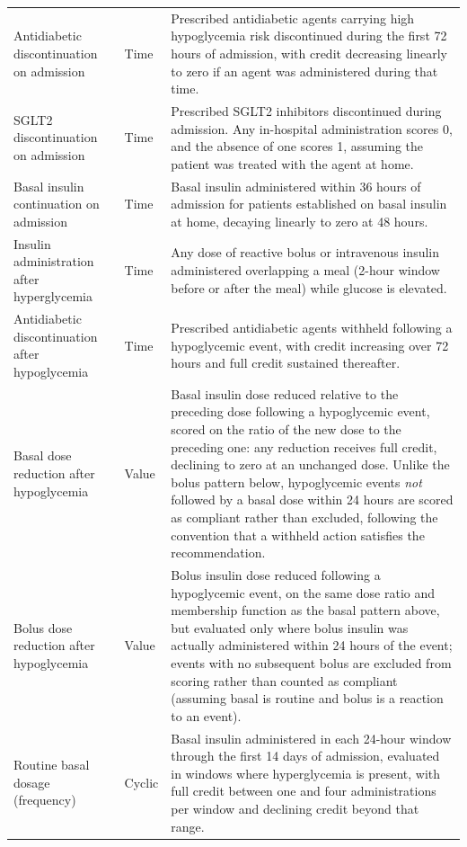 \begin{longtable}{
>{\raggedright\arraybackslash}p{}
>{\raggedright\arraybackslash}p{}
>{\raggedright\arraybackslash}p{}
}
Antidiabetic discontinuation on admission & Time &
Prescribed antidiabetic agents carrying high hypoglycemia risk discontinued during the first 72 hours of admission, with credit decreasing linearly to zero if an agent was administered during that time. \\[2pt]
SGLT2 discontinuation on admission & Time &
Prescribed SGLT2 inhibitors discontinued during admission. Any in-hospital administration scores 0, and the absence of one scores 1, assuming the patient was treated with the agent at home. \\[2pt]
Basal insulin continuation on admission & Time &
Basal insulin administered within 36 hours of admission for patients established on basal insulin at home, decaying linearly to zero at 48 hours. \\[2pt]
Insulin administration after hyperglycemia & Time &
Any dose of reactive bolus or intravenous insulin administered overlapping a meal (2-hour window before or after the meal) while glucose is elevated. \\[2pt]
Antidiabetic discontinuation after hypoglycemia & Time &
Prescribed antidiabetic agents withheld following a hypoglycemic event, with credit increasing over 72 hours and full credit sustained thereafter. \\[2pt]
Basal dose reduction after hypoglycemia & Value &
Basal insulin dose reduced relative to the preceding dose following a hypoglycemic event, scored on the ratio of the new dose to the preceding one: any reduction receives full credit, declining to zero at an unchanged dose. Unlike the bolus pattern below, hypoglycemic events \emph{not} followed by a basal dose within 24 hours are scored as compliant rather than excluded, following the convention that a withheld action satisfies the recommendation. \\[2pt]
Bolus dose reduction after hypoglycemia & Value &
Bolus insulin dose reduced following a hypoglycemic event, on the same dose ratio and membership function as the basal pattern above, but evaluated only where bolus insulin was actually administered within 24 hours of the event; events with no subsequent bolus are excluded from scoring rather than counted as compliant (assuming basal is routine and bolus is a reaction to an event). \\[2pt]
Routine basal dosage (frequency) & Cyclic &
Basal insulin administered in each 24-hour window through the first 14 days of admission, evaluated in windows where hyperglycemia is present, with full credit between one and four administrations per window and declining credit beyond that range. \\[2pt]

\end{longtable}
